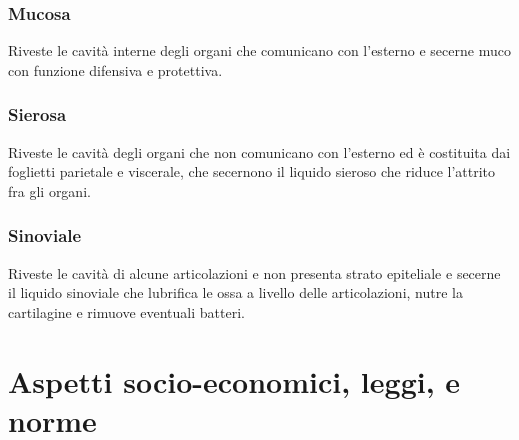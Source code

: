 \documentclass[a4paper]{article}
\begin{document}
\subsubsection{Mucosa}
Riveste le cavità interne degli organi che comunicano con l’esterno e secerne 
muco con funzione difensiva e protettiva.
\subsubsection{Sierosa}
Riveste le cavità degli organi che non comunicano con l’esterno ed è costituita
dai foglietti parietale e viscerale, che secernono il liquido sieroso che 
riduce l’attrito fra gli organi.
\subsubsection{Sinoviale}
Riveste le cavità di alcune articolazioni e non presenta strato epiteliale e 
secerne il liquido sinoviale che lubrifica le ossa a livello delle 
articolazioni, nutre la cartilagine e rimuove eventuali batteri.

\section{Aspetti socio-economici, leggi, e norme}
\end{document}
